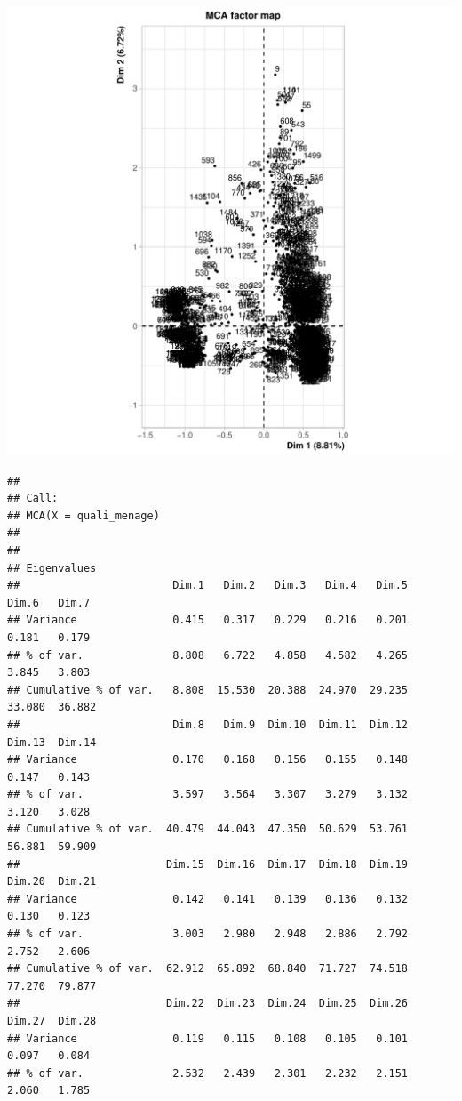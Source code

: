 \documentclass[11pt,a4paper, x11names]{article}\usepackage[]{graphicx}\usepackage[]{color}
\makeatletter
\def\maxwidth{ %
  \ifdim\Gin@nat@width>\linewidth
    \linewidth
  \else
    \Gin@nat@width
  \fi
}
\newenvironment{kframe}{%
 \def\at@end@of@kframe{}%
 \ifinner\ifhmode%
  \def\at@end@of@kframe{\end{minipage}}%
  \begin{minipage}{\columnwidth}%
 \fi\fi%
 \def\FrameCommand##1{\hskip\@totalleftmargin \hskip-\fboxsep
 \colorbox{shadecolor}{##1}\hskip-\fboxsep
     \hskip-\linewidth \hskip-\@totalleftmargin \hskip\columnwidth}%
 \MakeFramed {\advance\hsize-\width
   \@totalleftmargin\z@ \linewidth\hsize
   \@setminipage}}%
 {\par\unskip\endMakeFramed%
 \at@end@of@kframe}
\newenvironment{knitrout}{}{} %
\makeatother
\begin{document}
\begin{knitrout}
\includegraphics[width=\maxwidth]{figure/Analyse_factorielle-4} 
\begin{kframe}\begin{verbatim}
## 
## Call:
## MCA(X = quali_menage) 
## 
## 
## Eigenvalues
##                        Dim.1   Dim.2   Dim.3   Dim.4   Dim.5   Dim.6   Dim.7
## Variance               0.415   0.317   0.229   0.216   0.201   0.181   0.179
## % of var.              8.808   6.722   4.858   4.582   4.265   3.845   3.803
## Cumulative % of var.   8.808  15.530  20.388  24.970  29.235  33.080  36.882
##                        Dim.8   Dim.9  Dim.10  Dim.11  Dim.12  Dim.13  Dim.14
## Variance               0.170   0.168   0.156   0.155   0.148   0.147   0.143
## % of var.              3.597   3.564   3.307   3.279   3.132   3.120   3.028
## Cumulative % of var.  40.479  44.043  47.350  50.629  53.761  56.881  59.909
##                       Dim.15  Dim.16  Dim.17  Dim.18  Dim.19  Dim.20  Dim.21
## Variance               0.142   0.141   0.139   0.136   0.132   0.130   0.123
## % of var.              3.003   2.980   2.948   2.886   2.792   2.752   2.606
## Cumulative % of var.  62.912  65.892  68.840  71.727  74.518  77.270  79.877
##                       Dim.22  Dim.23  Dim.24  Dim.25  Dim.26  Dim.27  Dim.28
## Variance               0.119   0.115   0.108   0.105   0.101   0.097   0.084
## % of var.              2.532   2.439   2.301   2.232   2.151   2.060   1.785

\end{verbatim}
\end{kframe}
\end{knitrout}
\end{document}
